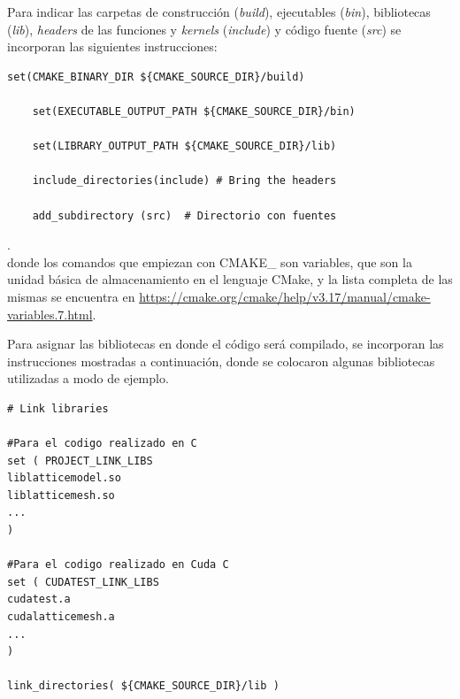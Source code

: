 Para indicar las carpetas de construcción (\textit{build}), ejecutables (\textit{bin}), bibliotecas (\textit{lib}), \textit{headers} de las funciones y \textit{kernels} (\textit{include}) y código fuente (\textit{src}) se incorporan las siguientes instrucciones:
{\footnotesize
	\begin{frame}{}
		\begin{lstlisting}[frame=single]
	set(CMAKE_BINARY_DIR ${CMAKE_SOURCE_DIR}/build)

	set(EXECUTABLE_OUTPUT_PATH ${CMAKE_SOURCE_DIR}/bin)

	set(LIBRARY_OUTPUT_PATH ${CMAKE_SOURCE_DIR}/lib)

	include_directories(include) # Bring the headers
	
	add_subdirectory (src) 	# Directorio con fuentes

		\end{lstlisting}
		
	\end{frame}
}.
\\
donde los comandos que empiezan con \textsc{CMAKE\_} son variables, que son la unidad básica de almacenamiento en el lenguaje CMake, y la lista completa de las mismas se encuentra en \url{https://cmake.org/cmake/help/v3.17/manual/cmake-variables.7.html}.


Para asignar las bibliotecas en donde el código será compilado, se incorporan las instrucciones mostradas a continuación, donde se colocaron algunas bibliotecas utilizadas a modo de ejemplo.
\newpage
{\footnotesize
	\begin{frame}{}
		\begin{lstlisting}[frame=single]
# Link libraries

#Para el codigo realizado en C
set ( PROJECT_LINK_LIBS 
liblatticemodel.so 		
liblatticemesh.so
...
)

#Para el codigo realizado en Cuda C
set ( CUDATEST_LINK_LIBS 
cudatest.a
cudalatticemesh.a
...
)

link_directories( ${CMAKE_SOURCE_DIR}/lib )
		
		\end{lstlisting}
		
	\end{frame}
}

